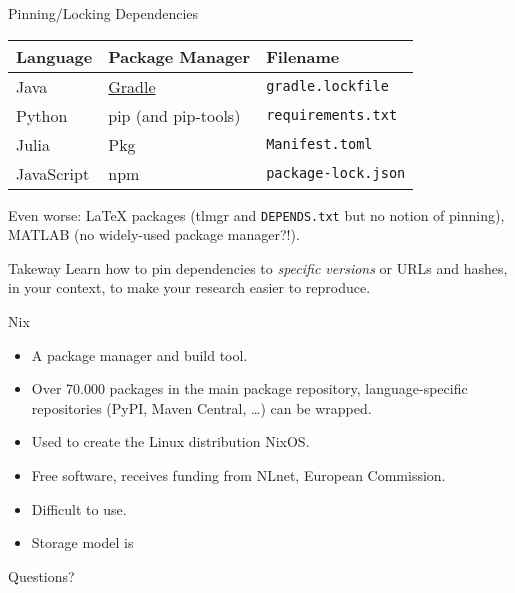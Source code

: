 \documentclass[xcolor={table,usenames,dvipsnames},aspectratio=169]{beamer}
\begin{document}
\begin{frame}{Pinning/Locking Dependencies}

\begin{center}
\begin{tabular}{lll}
Language & Package Manager & Filename \\
\hline
Java & \href{https://docs.gradle.org/7.4.2/userguide/dependency\_locking.html}{Gradle} & \texttt{gradle.lockfile} \\
Python & pip (and pip-tools) & \texttt{requirements.txt} \\
Julia & Pkg & \texttt{Manifest.toml} \\
JavaScript & npm & \texttt{package-lock.json}
\end{tabular}
\end{center}



Even worse: LaTeX packages (tlmgr and \texttt{DEPENDS.txt} but no notion of pinning),
MATLAB (no widely-used package manager?!).

\begin{block}{Takeway}
Learn how to pin dependencies to \emph{specific versions} or URLs and hashes,
in your context, to make your research easier to
reproduce.
\end{block}

\end{frame}

\begin{frame}{Nix}
\begin{itemize}
  \item{A package manager and build tool.}
  \item{Over 70.000 packages in the main package repository, language-specific repositories (PyPI, Maven Central, \dots) can be wrapped.}
  \item{Used to create the Linux distribution NixOS.}
  \item{Free software, receives funding from NLnet, European Commission.}
  \item{Difficult to use.}
  \item{Storage model is }
\end{itemize}
\end{frame}

\begin{frame}[standout]
Questions?
\end{frame}
\end{document}
